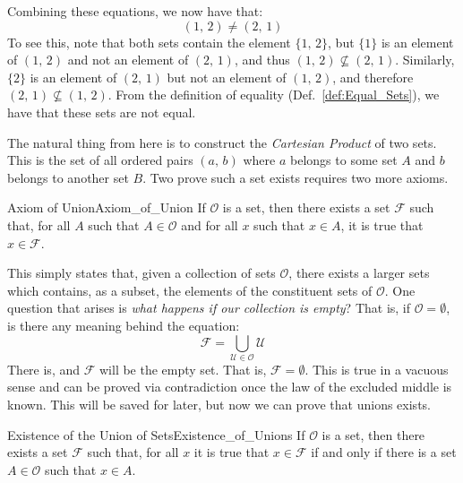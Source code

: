         \par\vspace{2.5ex}
        Combining these equations, we now have that:
        \begin{equation}
            (1,\,2)\ne(2,\,1)
        \end{equation}
        To see this, note that both sets contain the element $\{1,\,2\}$, but
        $\{1\}$ is an element of $(1,\,2)$ and not an element of $(2,\,1)$,
        and thus $(1,\,2)\nsubseteq(2,\,1)$. Similarly, $\{2\}$ is an element
        of $(2,\,1)$ but not an element of $(1,\,2)$, and therefore
        $(2,\,1)\nsubseteq(1,\,2)$. From the definition of equality
        (Def.~\ref{def:Equal_Sets}), we have that these sets are not equal.
        \par\hfill\par
        The natural thing from here is to construct the
        \textit{Cartesian Product} of two sets. This is the set of all ordered
        pairs $(a,\,b)$ where $a$ belongs to some set $A$ and $b$ belongs to
        another set $B$. Two prove such a set exists requires two more axioms.
        \begin{faxiom}{Axiom of Union}{Axiom_of_Union}
            If $\mathcal{O}$ is a set, then there exists a set $\mathcal{F}$
            such that, for all $A$ such that $A\in\mathcal{O}$ and for all
            $x$ such that $x\in{A}$, it is true that $x\in\mathcal{F}$.
        \end{faxiom}
        This simply states that, given a collection of sets $\mathcal{O}$,
        there exists a larger sets which contains, as a subset, the elements
        of the constituent sets of $\mathcal{O}$. One question that arises is
        \textit{what happens if our collection is empty}? That is, if
        $\mathcal{O}=\emptyset$, is there any meaning behind the equation:
        \begin{equation}
            \mathcal{F}=\bigcup_{\mathcal{U}\in\mathcal{O}}\mathcal{U}
        \end{equation}
        There is, and $\mathcal{F}$ will be the empty set. That is,
        $\mathcal{F}=\emptyset$. This is true in a vacuous sense and can be
        proved via contradiction once the law of the excluded middle is known.
        This will be saved for later, but now we can prove that unions exists.
        \begin{ltheorem}{Existence of the Union of Sets}{Existence_of_Unions}
            If $\mathcal{O}$ is a set, then there exists a set $\mathcal{F}$
            such that, for all $x$ it is true that $x\in\mathcal{F}$ if and
            only if there is a set $A\in\mathcal{O}$ such that $x\in{A}$.
        \end{ltheorem}
